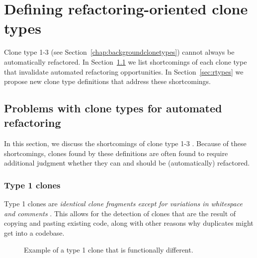 \chapter{Defining refactoring-oriented clone types}\label{chap:clonetypes}
Clone type 1-3 (see Section~\ref{chap:backgroundclonetypes}) cannot always be automatically refactored. In Section~\ref{sec:literaturetypeproblems} we list shortcomings of each clone type that invalidate automated refactoring opportunities. In Section~\ref{sec:rtypes} we propose new clone type definitions that address these shortcomings.

\section{Problems with clone types for automated refactoring}\label{sec:literaturetypeproblems}
In this section, we discuss the shortcomings of clone type 1-3 \cite{roy2007survey}. Because of these shortcomings, clones found by these definitions are often found to require additional judgment whether they can and should be (automatically) refactored.

\subsection{Type 1 clones}\label{sec:type1}
Type 1 clones are \textit{identical clone fragments except for variations in whitespace and comments} \cite{roy2007survey}. This allows for the detection of clones that are the result of copying and pasting existing code, along with other reasons why duplicates might get into a codebase.

\begin{figure}[H]
\begin{parcolumns}{2}
\end{parcolumns}
\caption{Example of a type 1 clone that is functionally different.}
\label{fig:type1}
\end{figure}

